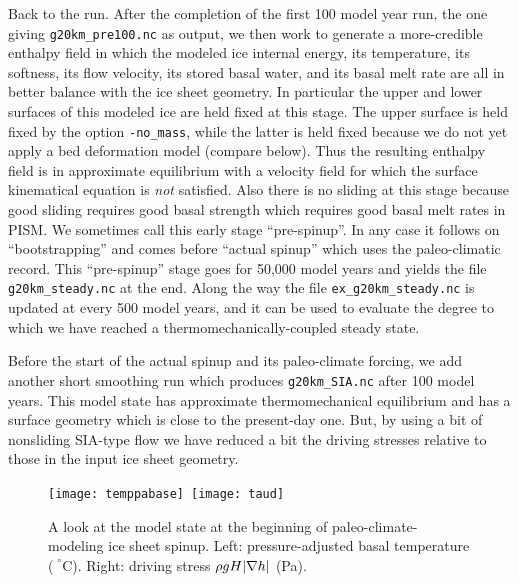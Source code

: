 Back to the run.  After the completion of the first 100 model year run, the one giving \texttt{g20km_pre100.nc} as output, we then work to generate a more-credible enthalpy field in which the modeled ice internal energy, its temperature, its softness, its flow velocity, its stored basal water, and its basal melt rate are all in better balance with the ice sheet geometry.  In particular the upper and lower surfaces of this modeled ice are held fixed at this stage.  The upper surface is held fixed by the option \texttt{-no_mass}, while the latter is held fixed because we do not yet apply a bed deformation model (compare below).  Thus the resulting enthalpy field is in approximate equilibrium with a velocity field for which the surface kinematical equation \cite{Fowler} is \emph{not} satisfied.  Also there is no sliding at this stage because good sliding requires good basal strength which requires good basal melt rates in PISM.  We sometimes call this early stage ``pre-spinup''.  In any case it follows on ``bootstrapping'' and comes before ``actual spinup'' which uses the paleo-climatic record.  This ``pre-spinup'' stage goes for 50,000 model years and yields the file \texttt{g20km_steady.nc} at the end.  Along the way the file \texttt{ex_g20km_steady.nc} is updated at every 500 model years, and it can be used to evaluate the degree to which we have reached a thermomechanically-coupled steady state.

Before the start of the actual spinup and its paleo-climate forcing, we add another short smoothing run which produces \texttt{g20km_SIA.nc} after 100 model years.  This model state has approximate thermomechanical equilibrium and has a surface geometry which is close to the present-day one.  But, by using a bit of nonsliding SIA-type flow we have reduced a bit the driving stresses relative to those in the input ice sheet geometry.

\begin{figure}[ht]
\centering
\mbox{\texttt{[image: temppabase]}
  \qquad \texttt{[image: taud]}}
\caption{A look at the model state at the beginning of paleo-climate-modeling ice sheet spinup.  Left: pressure-adjusted basal temperature ($\phantom{|}^\circ$C).  Right: driving stress $\rho g H |\nabla h|$ (Pa).}
\label{fig:sr-spinstart}
\end{figure}

